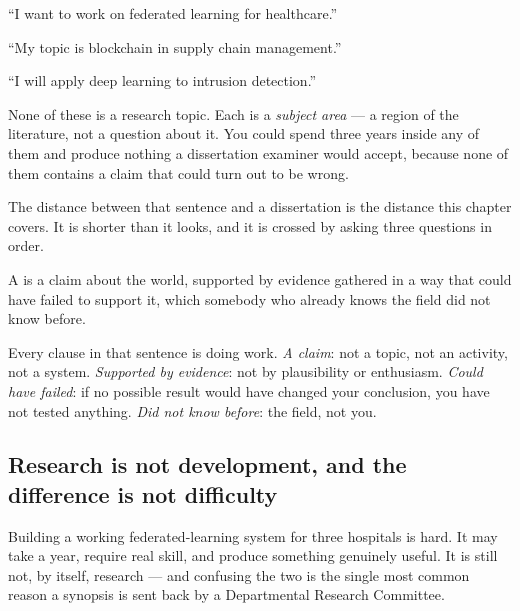 \begin{tight}
  \item ``I want to work on federated learning for healthcare.''
  \item ``My topic is blockchain in supply chain management.''
  \item ``I will apply deep learning to intrusion detection.''
\end{tight}

None of these is a research topic. Each is a \emph{subject area} --- a region
of the literature, not a question about it. You could spend three years inside
any of them and produce nothing a dissertation examiner would accept, because
none of them contains a claim that could turn out to be wrong.

The distance between that sentence and a dissertation is the distance this
chapter covers. It is shorter than it looks, and it is crossed by asking three
questions in order.

\begin{definitionbox}
A  is a claim about the world, supported by evidence
gathered in a way that could have failed to support it, which somebody who
already knows the field did not know before.

\medskip
Every clause in that sentence is doing work. \emph{A claim}: not a topic, not
an activity, not a system. \emph{Supported by evidence}: not by plausibility or
enthusiasm. \emph{Could have failed}: if no possible result would have changed
your conclusion, you have not tested anything. \emph{Did not know before}: the
field, not you.
\end{definitionbox}

\subsection{Research is not development, and the difference is not difficulty}

Building a working federated-learning system for three hospitals is hard. It
may take a year, require real skill, and produce something genuinely useful.
It is still not, by itself, research --- and confusing the two is the single
most common reason a synopsis is sent back by a Departmental Research
Committee.

